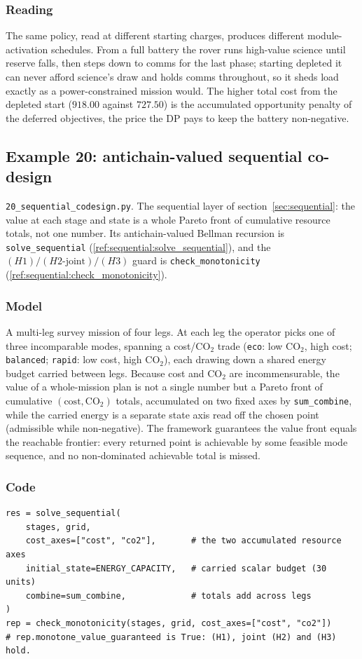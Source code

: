 \documentclass[11pt,a4paper]{article}
\begin{document}
\subsubsection*{Reading}
The same policy, read at different starting charges, produces different
module-activation schedules. From a full battery the rover runs
high-value science until reserve falls, then steps down to comms for the
last phase; starting depleted it can never afford science's draw and holds
comms throughout, so it sheds load exactly as a power-constrained mission
would. The higher total cost from the depleted start ($918.00$ against
$727.50$) is the accumulated opportunity penalty of the deferred
objectives, the price the DP pays to keep the battery non-negative.

\subsection{Example 20: antichain-valued sequential co-design}
\label{ex:20}

\texttt{20\_sequential\_codesign.py}. The sequential layer of
section~\ref{sec:sequential}: the value at each stage and state is a whole
Pareto front of cumulative resource totals, not one number. Its antichain-valued Bellman recursion is
\texttt{solve\_sequential} (\ref{ref:sequential:solve_sequential}), and the
$(H1)/(H2\text{-joint})/(H3)$ guard is \texttt{check\_monotonicity}
(\ref{ref:sequential:check_monotonicity}).

\subsubsection*{Model}
A multi-leg survey mission of four legs. At each leg the operator picks
one of three incomparable modes, spanning a cost/CO$_2$ trade
(\texttt{eco}: low CO$_2$, high cost; \texttt{balanced}; \texttt{rapid}:
low cost, high CO$_2$), each drawing down a shared energy budget carried
between legs. Because cost and CO$_2$ are incommensurable, the value of a
whole-mission plan is not a single number but a Pareto front of
cumulative $(\text{cost},\text{CO}_2)$ totals, accumulated on two fixed
axes by \texttt{sum\_combine}, while the carried energy is a separate
state axis read off the chosen point (admissible while non-negative). The
framework guarantees the value front equals the reachable frontier: every
returned point is achievable by some feasible mode sequence, and no
non-dominated achievable total is missed.

\subsubsection*{Code}
\begin{lstlisting}
res = solve_sequential(
    stages, grid,
    cost_axes=["cost", "co2"],       # the two accumulated resource axes
    initial_state=ENERGY_CAPACITY,   # carried scalar budget (30 units)
    combine=sum_combine,             # totals add across legs
)
rep = check_monotonicity(stages, grid, cost_axes=["cost", "co2"])
# rep.monotone_value_guaranteed is True: (H1), joint (H2) and (H3) hold.
\end{lstlisting}
\end{document}
